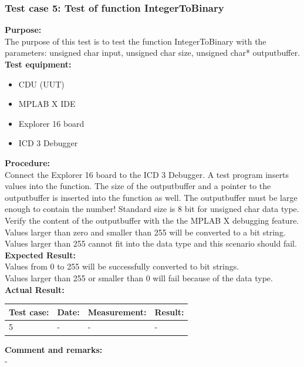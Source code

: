 \subsubsection{Test case 5: Test of function IntegerToBinary }
\textbf{Purpose:}\\
The purpose of this test is to test the function IntegerToBinary with the parameters: unsigned char input, unsigned char size, unsigned char* outputbuffer.\\

\textbf{Test equipment:}
\begin{itemize}
\item CDU (UUT)
\item MPLAB X IDE
\item Explorer 16 board
\item ICD 3 Debugger
\end{itemize}

\textbf{Procedure:}\\
Connect the Explorer 16 board to the ICD 3 Debugger. A test program inserts values into the function. The size of the outputbuffer and a pointer to the outputbuffer is inserted into the function as well. The outputbuffer must be large enough to contain the number! Standard size is 8 bit for unsigned char data type.\\
Verify the content of the outputbuffer with the the MPLAB X debugging feature. Values larger than zero and smaller than 255 will be converted to a bit string. Values larger than 255 cannot fit into the data type and this scenario should fail.\\

\textbf{Expected Result:}\\
Values from 0 to 255  will be successfully converted to bit strings.\\
Values larger than 255 or smaller than 0 will fail because of the data type.\\

\textbf{Actual Result:}\\
\begin{table}[H]
\centering
\begin{tabular}{|p{2cm}|p{2cm}|p{3cm}|p{2cm}|}\hline
\textbf{Test case:} & \textbf{Date:} & \textbf{Measurement:} & \textbf{Result:} \\ \hline
5 & - & - & - \\ \hline
\end{tabular}
\end{table}

\textbf{Comment and remarks:}\\
-\\

